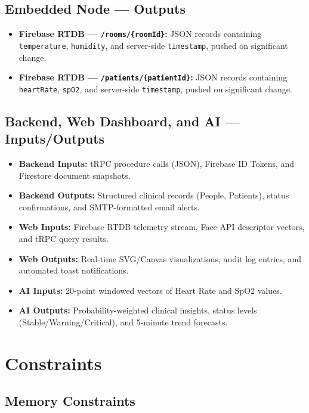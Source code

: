 \subsection*{Embedded Node — Outputs}

\begin{itemize}
	\item \textbf{Firebase RTDB — \texttt{/rooms/\{roomId\}}:}
	      JSON records containing \texttt{temperature}, \texttt{humidity}, and
	      server-side \texttt{timestamp}, pushed on significant change.
	\item \textbf{Firebase RTDB — \texttt{/patients/\{patientId\}}:}
	      JSON records containing \texttt{heartRate}, \texttt{spO2}, and
	      server-side \texttt{timestamp}, pushed on significant change.
\end{itemize}

\subsection*{Backend, Web Dashboard, and AI — Inputs/Outputs}

\begin{itemize}
    \item \textbf{Backend Inputs:} tRPC procedure calls (JSON), Firebase ID Tokens, and Firestore document snapshots.
    \item \textbf{Backend Outputs:} Structured clinical records (People, Patients), status confirmations, and SMTP-formatted email alerts.
    \item \textbf{Web Inputs:} Firebase RTDB telemetry stream, Face-API descriptor vectors, and tRPC query results.
    \item \textbf{Web Outputs:} Real-time SVG/Canvas visualizations, audit log entries, and automated toast notifications.
    \item \textbf{AI Inputs:} 20-point windowed vectors of Heart Rate and SpO2 values.
    \item \textbf{AI Outputs:} Probability-weighted clinical insights, status levels (Stable/Warning/Critical), and 5-minute trend forecasts.
\end{itemize}

\section{Constraints}

\subsection*{Memory Constraints}

